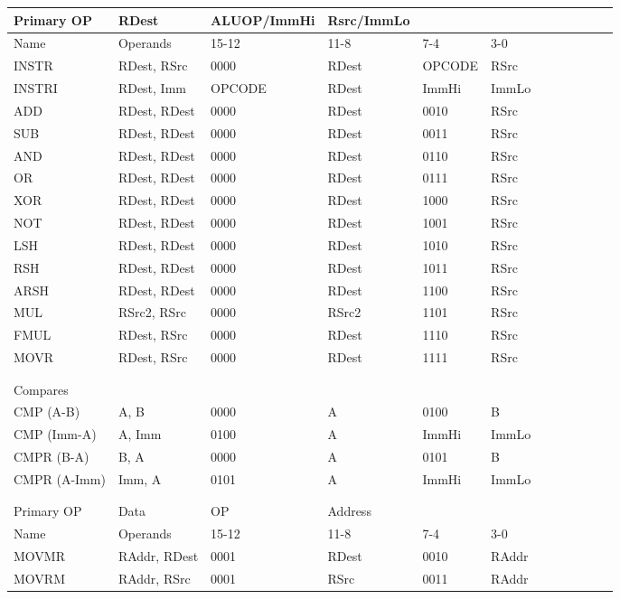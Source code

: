 \documentclass[a4paper]{article}
\begin{document}
\begin{tabular}{|l|l|l|l|l|l|l|l|l|l|l|l|}
\hline
Primary OP&RDest&ALUOP/ImmHi&Rsrc/ImmLo&&&&&&
&&\\
\hline
Name&Operands&15-12&11-8&7-4&3-0&&&&
&&\\
\hline
INSTR&RDest, RSrc&0000&RDest&OPCODE&RSrc&&&&
&&\\
\hline
INSTRI&RDest, Imm&OPCODE&RDest&ImmHi&ImmLo&&&&
&&\\
\hline
ADD&RDest, RDest&0000&RDest&0010&RSrc&&&&
&&\\
\hline
SUB&RDest, RDest&0000&RDest&0011&RSrc&&&&
&&\\
\hline
AND&RDest, RDest&0000&RDest&0110&RSrc&&&&
&&\\
\hline
OR&RDest, RDest&0000&RDest&0111&RSrc&&&&
&&\\
\hline
XOR&RDest, RDest&0000&RDest&1000&RSrc&&&&
&&\\
\hline
NOT&RDest, RDest&0000&RDest&1001&RSrc&&&&
&&\\
\hline
LSH&RDest, RDest&0000&RDest&1010&RSrc&&&&
&&\\
\hline
RSH&RDest, RDest&0000&RDest&1011&RSrc&&&&
&&\\
\hline
ARSH&RDest, RDest&0000&RDest&1100&RSrc&&&&
&&\\
\hline
MUL&RSrc2, RSrc&0000&RSrc2&1101&RSrc&&&&
&&\\
\hline
FMUL&RDest, RSrc&0000&RDest&1110&RSrc&&&&
&&\\
\hline
MOVR&RDest, RSrc&0000&RDest&1111&RSrc&&&&
&&\\
\hline
&&&&&&&&&
&&\\
\hline
&&&&&&&&&
&&\\
\hline
Compares&&&&&&&&&
&&\\
\hline
CMP (A-B)&A, B&0000&A&0100&B&&&&
&&\\
\hline
CMP (Imm-A)&A, Imm&0100&A&ImmHi&ImmLo&&&&
&&\\
\hline
CMPR (B-A)&B, A&0000&A&0101&B&&&&
&&\\
\hline
CMPR (A-Imm)&Imm, A&0101&A&ImmHi&ImmLo&&&&
&&\\
\hline
&&&&&&&&&
&&\\
\hline
&&&&&&&&&
&&\\
\hline
Primary OP&Data&OP&Address&&&&&&
&&\\
\hline
Name&Operands&15-12&11-8&7-4&3-0&&&&
&&\\
\hline
MOVMR&RAddr, RDest&0001&RDest&0010&RAddr&&&&
&&\\
\hline
MOVRM&RAddr, RSrc&0001&RSrc&0011&RAddr&&&&
&&\\

\end{tabular}
\end{document}

